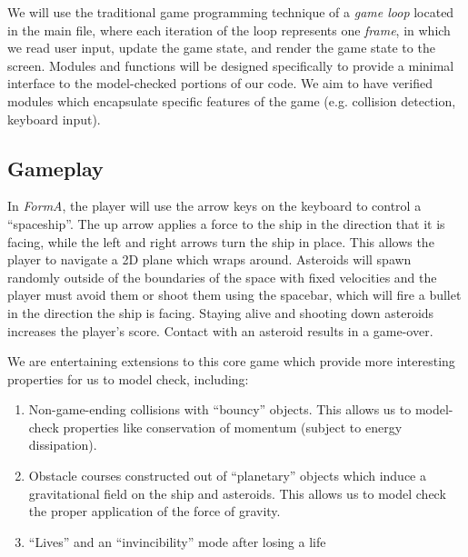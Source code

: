 \documentclass{article}
\newcommand{\Name}{\textit{FormA}\xspace}
\begin{document}
        We will use the traditional game programming technique of a \textit{game
        loop} located in the main file, where each iteration of the loop
        represents one \textit{frame}, in which we read user input, update the
        game state, and render the game state to the screen. Modules and
        functions will be designed specifically to provide a minimal interface
        to the model-checked portions of our code. We aim to have verified
        modules which encapsulate specific features of the game (e.g. collision
        detection, keyboard input).

    \subsection{Gameplay}

        In \Name{}, the player will use the arrow keys on the keyboard to
        control a ``spaceship''. The up arrow applies a force to the ship in the
        direction that it is facing, while the left and right arrows turn the
        ship in place. This allows the player to navigate a 2D plane which wraps
        around. Asteroids will spawn randomly outside of the boundaries of the
        space with fixed velocities and the player must avoid them or shoot them
        using the spacebar, which will fire a bullet in the direction the ship
        is facing. Staying alive and shooting down asteroids increases the
        player's score. Contact with an asteroid results in a game-over.

        We are entertaining extensions to this core game which provide more
        interesting properties for us to model check, including:

        \begin{enumerate}
            \item{Non-game-ending collisions with ``bouncy'' objects. This allows
                  us to model-check properties like conservation of momentum
                  (subject to energy dissipation).}
            \item{Obstacle courses constructed out of ``planetary'' objects which
                  induce a gravitational field on the ship and asteroids. This
                  allows us to model check the proper application of the force
                  of gravity.}
			\item{``Lives'' and an ``invincibility'' mode after losing a life}
        \end{enumerate}
\end{document}
